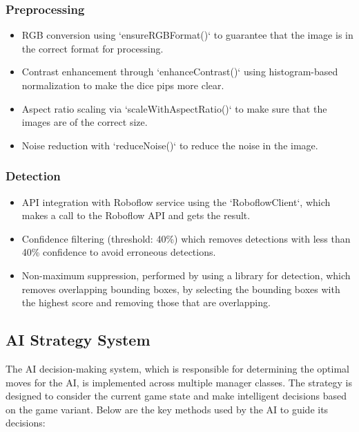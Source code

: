 \subsubsection{Preprocessing}
    \begin{itemize}
        \item RGB conversion using `ensureRGBFormat()` to guarantee that the image is in the correct format for processing.
        \item Contrast enhancement through `enhanceContrast()` using histogram-based normalization to make the dice pips more clear.
        \item Aspect ratio scaling via `scaleWithAspectRatio()` to make sure that the images are of the correct size.
        \item Noise reduction with `reduceNoise()` to reduce the noise in the image.
    \end{itemize}
\subsubsection{Detection}
    \begin{itemize}
        \item API integration with Roboflow service using the `RoboflowClient`, which makes a call to the Roboflow API and gets the result.
        \item Confidence filtering (threshold: 40\%) which removes detections with less than 40\% confidence to avoid erroneous detections.
        \item Non-maximum suppression, performed by using a library for detection, which removes overlapping bounding boxes, by selecting the bounding boxes with the highest score and removing those that are overlapping.
    \end{itemize}

\subsection{AI Strategy System}

The AI decision-making system, which is responsible for determining the optimal moves for the AI, is implemented across multiple manager classes. The strategy is designed to consider the current game state and make intelligent decisions based on the game variant. Below are the key methods used by the AI to guide its decisions:
    
